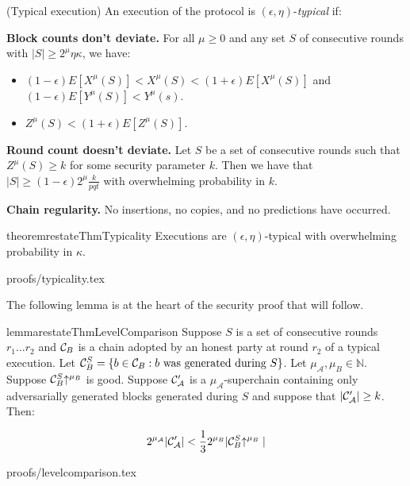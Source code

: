 \begin{definition}{(Typical execution)}
    An execution of the protocol is $(\epsilon, \eta)$-\textit{typical} if:

    \textnormal{\bf Block counts don't deviate.}
    For all $\mu \geq 0$ and any set $S$ of consecutive rounds
    with $|S| \geq 2^\mu \eta\kappa$, we have:

    \begin{itemize}
        \item $(1 - \epsilon)E[X^\mu(S)] < X^\mu(S) < (1 + \epsilon)E[X^\mu(S)]$ and $(1 - \epsilon)E[Y^\mu(S)] < Y^\mu(s)$.
        \item $Z^\mu(S) < (1 + \epsilon)E[Z^\mu(S)]$.
    \end{itemize}

    \textnormal{\bf Round count doesn't deviate.}
    Let $S$ be a set of consecutive rounds such that $Z^\mu(S)
    \geq k$ for some security parameter $k$. Then we have that $|S| \geq (1 -
    \epsilon)2^\mu\frac{k}{pqt}$ with overwhelming probability in $k$.

    \textnormal{\bf Chain regularity.}
    No insertions, no copies, and no predictions \cite{backbone} have occurred.
\end{definition}

\begin{restatable}[Typicality]{theorem}{restateThmTypicality}
\label{thm.typicality}
Executions are $(\epsilon, \eta)$-typical with overwhelming
probability in $\kappa$.
\end{restatable}
\ifonecolumn
{proofs/typicality.tex}
\fi

The following lemma is at the heart of the security proof that will follow.

\begin{restatable}{lemma}{restateThmLevelComparison}\label{lem.level-comparison}
    Suppose $S$ is a set of consecutive rounds $r_1 \ldots r_2$
    and $\mathcal{C}_B$ is
    a chain adopted by an honest party at round $r_2$ of a typical execution.
    Let $\mathcal{C}_B^S = \{b \in
    \mathcal{C}_B: b \textnormal{ was generated during } S\}$. Let $\mu_\mathcal{A},
    \mu_B \in \mathbb{N}$. Suppose $\mathcal{C}_B^S\negthickspace\uparrow^{\mu_B}$ is good.
    Suppose $\mathcal{C}'_\mathcal{A}$ is a $\mu_\mathcal{A}$-superchain containing
    only adversarially generated blocks generated during $S$ and suppose that
    $|\mathcal{C}'_\mathcal{A}| \geq k$.
    Then:

    \begin{equation*}
    2^{\mu_\mathcal{A}}|\mathcal{C}'_\mathcal{A}| < \frac{1}{3}2^{\mu_B}|\mathcal{C}_B^S\negthickspace\uparrow^{\mu_B}|
    \end{equation*}
\end{restatable}
\ifonecolumn
{proofs/levelcomparison.tex}
\fi

